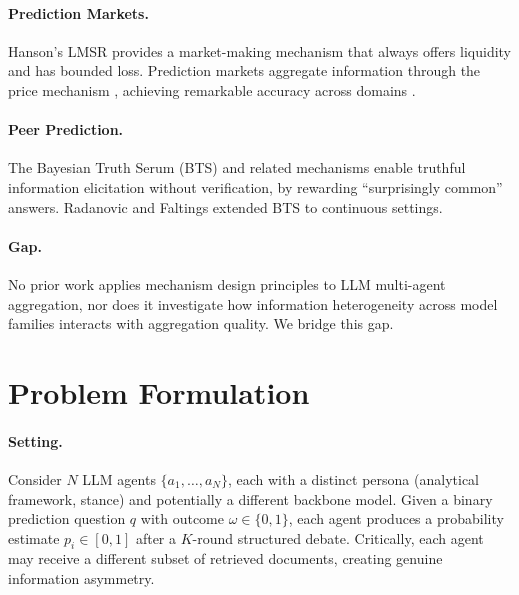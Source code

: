 \documentclass[conference]{IEEEtran}
\begin{document}
\paragraph{Prediction Markets.}
Hanson's LMSR \cite{hanson2003combinatorial, hanson2007logarithmic} provides a market-making mechanism that always offers liquidity and has bounded loss. Prediction markets aggregate information through the price mechanism \cite{wolfers2004prediction}, achieving remarkable accuracy across domains \cite{arrow2008promise}.

\paragraph{Peer Prediction.}
The Bayesian Truth Serum (BTS) \cite{prelec2004bayesian} and related mechanisms \cite{miller2005eliciting, witkowski2012robust} enable truthful information elicitation without verification, by rewarding ``surprisingly common'' answers. Radanovic and Faltings \cite{radanovic2013robust} extended BTS to continuous settings.

\paragraph{Gap.} No prior work applies mechanism design principles to LLM multi-agent aggregation, nor does it investigate how information heterogeneity across model families interacts with aggregation quality. We bridge this gap.


\section{Problem Formulation}
\label{sec:formulation}

\paragraph{Setting.}
Consider $N$ LLM agents $\{a_1, \ldots, a_N\}$, each with a distinct persona (analytical framework, stance) and potentially a different backbone model. Given a binary prediction question $q$ with outcome $\omega \in \{0, 1\}$, each agent produces a probability estimate $p_i \in [0, 1]$ after a $K$-round structured debate. Critically, each agent may receive a different subset of retrieved documents, creating genuine information asymmetry.
\end{document}
